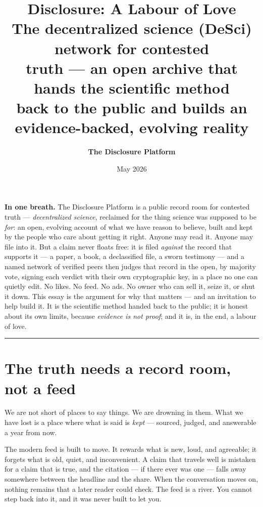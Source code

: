 \documentclass[11pt,a4paper]{article}
\title{
  \vspace{-2em}
  {\Huge\bfseries Disclosure: A Labour of Love}\\[0.6em]
  {\Large The decentralized science (DeSci) network for contested\\
   truth --- an open archive that hands the scientific method\\
   back to the public and builds an evidence-backed, evolving reality}
}
\author{\textbf{The Disclosure Platform}}
\date{May 2026}
\begin{document}
\maketitle
\thispagestyle{empty}

\vspace{-1em}
\begin{plainbox}
\textbf{In one breath.}
The Disclosure Platform is a public record room for contested truth ---
\emph{decentralized science}, reclaimed for the thing science was supposed
to be \emph{for}: an open, evolving account of what we have reason to
believe, built and kept by the people who care about getting it right.
Anyone may read it. Anyone may file into it. But a claim never floats
free: it is filed \emph{against} the record that supports it --- a paper,
a book, a declassified file, a sworn testimony --- and a named network of
verified peers then judges that record in the open, by majority vote,
signing each verdict with their own cryptographic key, in a place no one
can quietly edit. No likes. No feed. No ads. No owner who can sell it,
seize it, or shut it down. This essay is the argument for why that matters
--- and an invitation to help build it. It is the scientific method handed
back to the public; it is honest about its own limits, because
\emph{evidence is not proof}; and it is, in the end, a labour of love.
\end{plainbox}

\tableofcontents
\vspace{1em}
\hrule
\vspace{1em}

\section{The truth needs a record room, not a feed}

We are not short of places to say things. We are drowning in them. What we
have lost is a place where what is said is \emph{kept} --- sourced, judged,
and answerable a year from now.

The modern feed is built to move. It rewards what is new, loud, and
agreeable; it forgets what is old, quiet, and inconvenient. A claim that
travels well is mistaken for a claim that is true, and the citation --- if
there ever was one --- falls away somewhere between the headline and the
share. When the conversation moves on, nothing remains that a later reader
could check. The feed is a river. You cannot step back into it, and it was
never built to let you.
\end{document}
